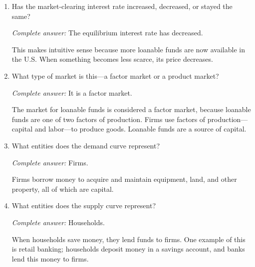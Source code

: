 \documentclass[
    letterpaper,paper=portrait,fleqn,
    DIV=16,fontsize=12pt,twoside=semi,
    parskip=full-,
    headings=standardclasses]
{scrartcl}
\begin{document}
\begin{enumerate}
\item Has the market-clearing interest rate increased, decreased, or stayed the same?

\begin{solution}
\emph{Complete answer:} The equilibrium interest rate has decreased.

This makes intuitive sense because more loanable funds are now available in the U.S. When something becomes less scarce, its price decreases.
\end{solution}

\item What type of market is this---a factor market or a product market?

\begin{solution}
\emph{Complete answer:} It is a factor market.

The market for loanable funds is considered a factor market, because loanable funds are one of two factors of production. Firms use factors of production---capital and labor---to produce goods. Loanable funds are a source of capital.
\end{solution}

\item What entities does the demand curve represent?

\begin{solution}
\emph{Complete answer:} Firms.

Firms borrow money to acquire and maintain equipment, land, and other property, all of which are capital.
\end{solution}

\item What entities does the supply curve represent?

\begin{solution}
\emph{Complete answer:} Households.

When households save money, they lend funds to firms. One example of this is retail banking; households deposit money in a savings account, and banks lend this money to firms.
\end{solution}

\end{enumerate}
\end{document}

